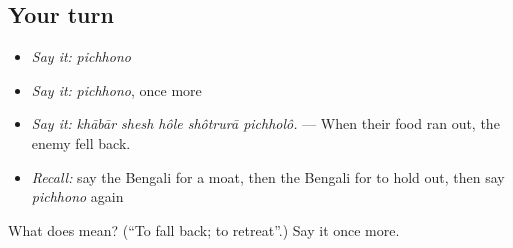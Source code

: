 \subsection*{Your turn}
\begin{itemize}
\raggedright
  \item \emph{Say it:} \emph{pichhono}
  \item \emph{Say it:} \emph{pichhono}, once more
  \item \emph{Say it:} \emph{khābār shesh hôle shôtrurā pichholô.} — When their food ran out, the enemy fell back.
  \item \emph{Recall:} say the Bengali for a moat, then the Bengali for to hold out, then say \emph{pichhono} again
\end{itemize}

\begin{tcolorbox}[breakable,colback=teal!4,colframe=teal!35!black,title={Before you move on}]
What does  mean? (\textquotedblleft{}To fall back; to retreat\textquotedblright{}.) Say it once more.
\end{tcolorbox}
